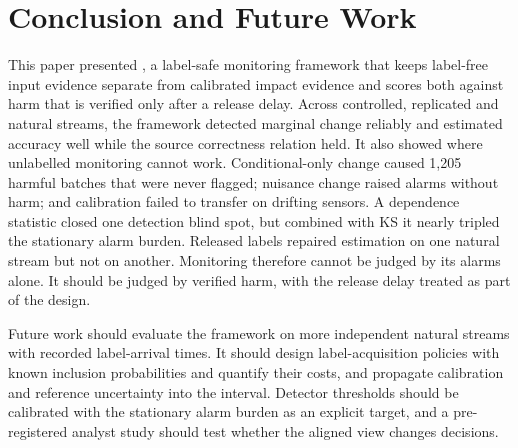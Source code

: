 \section{Conclusion and Future Work}
\label{sec:conclusion}
This paper presented \idm{}, a label-safe monitoring framework that keeps label-free
input evidence separate from calibrated impact evidence and scores both against harm
that is verified only after a release delay. Across controlled, replicated and natural
streams, the framework detected marginal change reliably and estimated accuracy well
while the source correctness relation held. It also showed where unlabelled monitoring
cannot work. Conditional-only change caused 1,205 harmful batches that were never
flagged; nuisance change raised alarms without harm; and calibration failed to
transfer on drifting sensors. A dependence statistic closed one detection blind spot, but
combined with KS it nearly tripled the stationary alarm burden. Released labels repaired estimation on one natural stream but
not on another. Monitoring therefore cannot be judged by its alarms alone. It should be
judged by verified harm, with the release delay treated as part of the design.

Future work should evaluate the framework on more independent natural streams with
recorded label-arrival times. It should design label-acquisition policies with known
inclusion probabilities and quantify their costs, and propagate calibration and
reference uncertainty into the interval. Detector thresholds should be calibrated with
the stationary alarm burden as an explicit target, and a pre-registered analyst study
should test whether the aligned view changes decisions.
